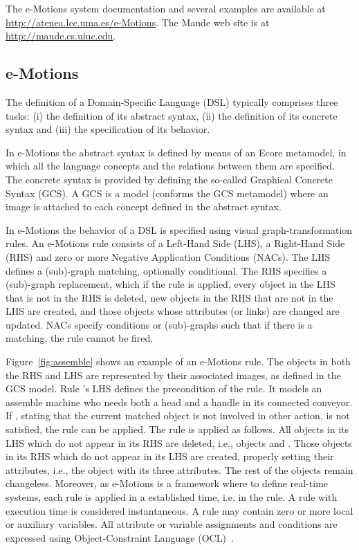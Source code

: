 The e-Motions system documentation and several examples are available at \url{http://atenea.lcc.uma.es/e-Motions}. The Maude web site is at \url{http://maude.cs.uiuc.edu}.

\subsection{e-Motions}\label{sub:emotions}

The definition of a Domain-Specific Language (DSL) typically comprises three tasks: (i) the definition of its abstract syntax, (ii) the definition of its concrete syntax and (iii) the specification of its behavior.

In e-Motions the abstract syntax is defined by means of an Ecore metamodel, in which all the language concepts and the relations between them are specified. The concrete syntax is provided by defining the so-called Graphical Concrete Syntax (GCS). A GCS is a model (conforms the GCS metamodel) where an image is attached to each concept defined in the abstract syntax.

In e-Motions the behavior of a DSL is specified using visual graph-transformation rules. An e-Motions rule consists of a Left-Hand Side (LHS), a Right-Hand Side (RHS) and zero or more Negative Application Conditions (NACs). The LHS defines a (sub)-graph matching, optionally conditional. The RHS specifies a (sub)-graph replacement, which if the rule is applied, every object in the LHS that is not in the RHS is deleted, new objects in the RHS that are not in the LHS are created, and those objects whose attributes (or links) are changed are updated. NACs specify conditions or (sub)-graphs such that if there is a matching, the rule cannot be fired.

Figure~\ref{fig:assemble} shows an example of an e-Motions rule. The objects in both the RHS and LHS are represented by their associated images, as defined in the GCS model. Rule 's LHS defines the precondition of the rule. It models an assemble machine who needs both a head and a handle in its connected conveyor. If , stating that the current matched  object is not involved in other  action, is not satisfied, the rule can be applied. The rule is applied as follows. All objects in its LHS which do not appear in its RHS are deleted, i.e., objects  and . Those objects in its RHS which do not appear in its LHS are created, properly setting their attributes, i.e., the  object with its three attributes. The rest of the objects remain changeless. Moreover, as \mbox{e-Motions} is a framework where to define real-time systems, each rule is applied in a established time, i.e.  in the  rule. A rule with execution time \code{[0,0]} is considered instantaneous. A rule may contain zero or more local or auxiliary variables. All attribute or variable assignments and conditions are expressed using Object-Constraint Language (OCL)~\cite{OCL-06-05-01}.

